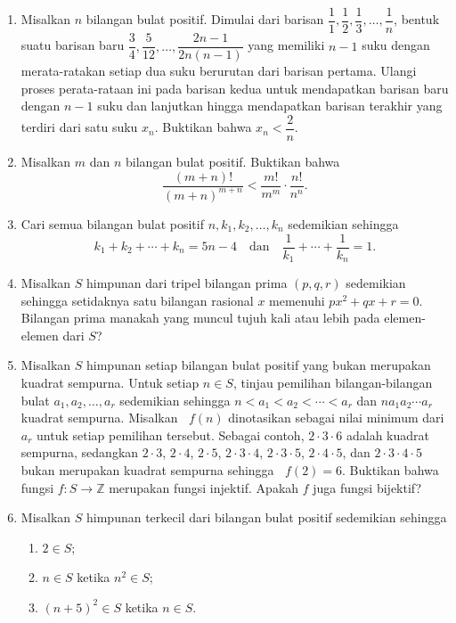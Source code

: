 \documentclass[12pt]{article}
\newcommand*\func[2]{\mathop{}\!{#1}{\left({#2}\right)}}
\begin{document}
\begin{enumerate}[leftmargin=*]
		\item Misalkan $ n $ bilangan bulat positif. Dimulai dari barisan $ \dfrac{1}{1}, \dfrac{1}{2}, \dfrac{1}{3}, \dots, \dfrac{1}{n} $, bentuk suatu barisan baru $ \dfrac{3}{4}, \dfrac{5}{12}, \dots, \dfrac{2n - 1}{2n\left(n - 1\right)} $ yang memiliki $ n - 1 $ suku dengan merata-ratakan setiap dua suku berurutan dari barisan pertama. Ulangi proses perata-rataan ini pada barisan kedua untuk mendapatkan barisan baru dengan $ n - 1 $ suku dan lanjutkan hingga mendapatkan barisan terakhir yang terdiri dari satu suku $ x_{n} $. Buktikan bahwa $ x_{n} < \dfrac{2}{n} $.
		\item Misalkan $ m $ dan $ n $ bilangan bulat positif. Buktikan bahwa
		\[ \frac{\left(m + n\right)!}{\left(m + n\right)^{m + n}} < \frac{m!}{m^{m}} \cdot \frac{n!}{n^{n}}. \]
		\item Cari semua bilangan bulat positif $ n, k_{1}, k_{2}, \dots, k_{n} $ sedemikian sehingga
		\[ k_{1} + k_{2} + \cdots + k_{n} = 5n - 4 \quad \mbox{dan} \quad \frac{1}{k_{1}} + \cdots + \frac{1}{k_{n}} = 1. \]
		\item Misalkan $ S $ himpunan dari tripel bilangan prima $ \left(p, q, r\right) $ sedemikian sehingga setidaknya satu bilangan rasional $ x $ memenuhi $ px^{2} + qx + r = 0 $. Bilangan prima manakah yang muncul tujuh kali atau lebih pada elemen-elemen dari $ S $?
		\item Misalkan $ S $ himpunan setiap bilangan bulat positif yang bukan merupakan kuadrat sempurna. Untuk setiap $ n \in S $, tinjau pemilihan bilangan-bilangan bulat $ a_{1}, a_{2}, \dots, a_{r} $ sedemikian sehingga $ n < a_{1} < a_{2} < \cdots < a_{r} $ dan $ na_{1}a_{2} \cdots a_{r} $ kuadrat sempurna. Misalkan $ \func{f}{n} $ dinotasikan sebagai nilai minimum dari $ a_{r} $ untuk setiap pemilihan tersebut. Sebagai contoh, $ 2 \cdot 3 \cdot 6 $ adalah kuadrat sempurna, sedangkan $ 2 \cdot 3 $, $ 2 \cdot 4 $, $ 2 \cdot 5 $, $ 2 \cdot 3 \cdot 4 $, $ 2 \cdot 3 \cdot 5 $, $ 2 \cdot 4 \cdot 5 $, dan $ 2 \cdot 3 \cdot 4 \cdot 5 $ bukan merupakan kuadrat sempurna sehingga $ \func{f}{2} = 6 $. Buktikan bahwa fungsi $ f : S \to \mathbb{Z} $ merupakan fungsi injektif. Apakah $ f $ juga fungsi bijektif?
		\item Misalkan $ S $ himpunan terkecil dari bilangan bulat positif sedemikian sehingga
		\begin{enumerate}
			\item $ 2 \in S $;
			\item $ n \in S $ ketika $ n^{2} \in S $;
			\item $ \left(n + 5\right)^{2} \in S $ ketika $ n \in S $.

\end{enumerate}
\end{enumerate}
\end{document}
